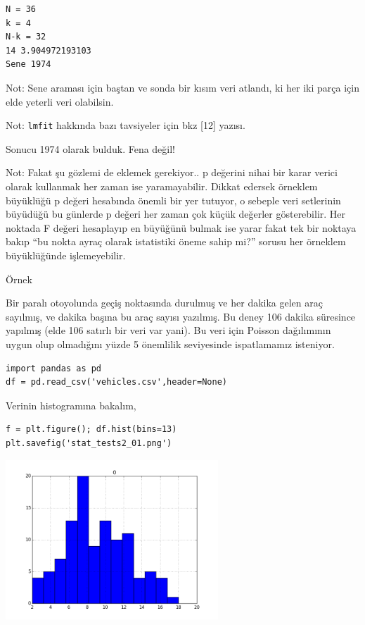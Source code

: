 \documentclass[12pt,fleqn]{article}\usepackage{../../common}
\begin{document}
\begin{verbatim}
N = 36
k = 4
N-k = 32
14 3.904972193103
Sene 1974
\end{verbatim}

Not: Sene araması için baştan ve sonda bir kısım veri atlandı, ki her iki
parça için elde yeterli veri olabilsin. 

Not: \verb!lmfit! hakkında bazı tavsiyeler için bkz [12] yazısı.

Sonucu 1974 olarak bulduk. Fena değil!

Not: Fakat şu gözlemi de eklemek gerekiyor.. p değerini nihai bir karar verici
olarak kullanmak her zaman ise yaramayabilir. Dikkat edersek örneklem büyüklüğü
p değeri hesabında önemli bir yer tutuyor, o sebeple veri setlerinin büyüdüğü bu
günlerde p değeri her zaman çok küçük değerler gösterebilir. Her noktada F
değeri hesaplayıp en büyüğünü bulmak ise yarar fakat tek bir noktaya bakıp
``bu nokta ayraç olarak istatistiki öneme sahip mi?'' sorusu her örneklem
büyüklüğünde işlemeyebilir. 

Örnek

Bir paralı otoyolunda geçiş noktasında durulmuş ve her dakika gelen araç
sayılmış, ve dakika başına bu araç sayısı yazılmış. Bu deney 106 dakika
süresince yapılmış (elde 106 satırlı bir veri var yani). Bu veri için
Poisson dağılımının uygun olup olmadığını yüzde 5 önemlilik seviyesinde
ispatlamamız isteniyor.

\begin{verbatim}
import pandas as pd
df = pd.read_csv('vehicles.csv',header=None)
\end{verbatim}

Verinin histogramına bakalım,

\begin{verbatim}
f = plt.figure(); df.hist(bins=13)
plt.savefig('stat_tests2_01.png')
\end{verbatim}

\includegraphics[height=6cm]{stat_tests2_01.png}
\end{document}
